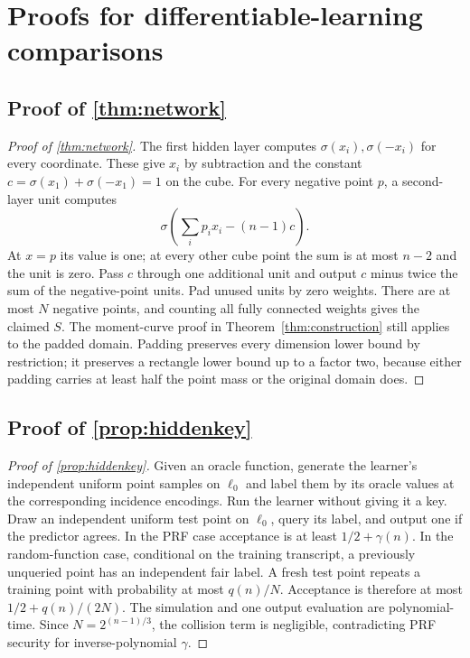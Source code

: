 \section{Proofs for differentiable-learning comparisons}\label{app:proofs-F}

\subsection[Proof of result network]{Proof of \cref{thm:network}}\label{proof:network}
\begin{proof}[Proof of \cref{thm:network}]
The first hidden layer computes $\sigma(x_i),\sigma(-x_i)$ for every coordinate. These give $x_i$ by subtraction and the constant $c=\sigma(x_1)+\sigma(-x_1)=1$ on the cube. For every negative point $p$, a second-layer unit computes
\[
 \sigma\left(\sum_i p_ix_i-(n-1)c\right).
\]
At $x=p$ its value is one; at every other cube point the sum is at most $n-2$ and the unit is zero. Pass $c$ through one additional unit and output $c$ minus twice the sum of the negative-point units. Pad unused units by zero weights. There are at most $N$ negative points, and counting all fully connected weights gives the claimed $S$. The moment-curve proof in Theorem~\ref{thm:construction} still applies to the padded domain. Padding preserves every dimension lower bound by restriction; it preserves a rectangle lower bound up to a factor two, because either padding carries at least half the point mass or the original domain does.
\end{proof}

\subsection[Proof of result hiddenkey]{Proof of \cref{prop:hiddenkey}}\label{proof:hiddenkey}
\begin{proof}[Proof of \cref{prop:hiddenkey}]
Given an oracle function, generate the learner's independent uniform point samples on $\ell_0$ and label them by its oracle values at the corresponding incidence encodings. Run the learner without giving it a key. Draw an independent uniform test point on $\ell_0$, query its label, and output one if the predictor agrees. In the PRF case acceptance is at least $1/2+\gamma(n)$. In the random-function case, conditional on the training transcript, a previously unqueried point has an independent fair label. A fresh test point repeats a training point with probability at most $q(n)/N$. Acceptance is therefore at most $1/2+q(n)/(2N)$. The simulation and one output evaluation are polynomial-time. Since $N=2^{(n-1)/3}$, the collision term is negligible, contradicting PRF security for inverse-polynomial $\gamma$.
\end{proof}
